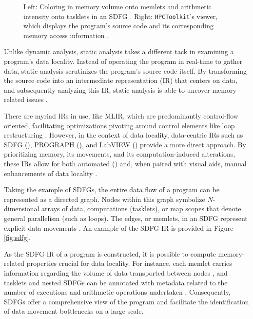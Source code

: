 \begin{figure}
\begin{subfigure}[c]{.68\textwidth}
	\end{subfigure}
	\caption{Left: Coloring in memory volume onto memlets and arithmetic intensity onto tasklets in an SDFG \cite{schaad2021boosting}. Right: \texttt{HPCToolkit}'s viewer, which displays the program's source code and its corresponding memory access information \cite{adhianto2010hpctoolkit}.}
	\label{fig:coarse}
\end{figure}

Unlike dynamic analysis, static analysis takes a different tack in examining a program's data locality. Instead of operating the program in real-time to gather data, static analysis scrutinizes the program's source code itself. By transforming the source code into an intermediate representation (IR) that centers on data, and subsequently analyzing this IR, static analysis is able to uncover memory-related issues \cite{schaad2022boosting,schaad2021boosting,calotoiu2022lifting,ben2023bridging}.

There are myriad IRs in use, like MLIR, which are predominantly control-flow oriented, facilitating optimizations pivoting around control elements like loop restructuring \cite{moses2021polygeist}. However, in the context of data locality, data-centric IRs such as SDFG (\cite{ben2019statefulSDFG}), PROGRAPH (\cite{matwin1985prograph}), and LabVIEW (\cite{kodosky2020labview}) provide a more direct approach. By prioritizing memory, its movements, and its computation-induced alterations, these IRs allow for both automated (\cite{ben2019statefulSDFG}) and, when paired with visual aids, manual enhancements of data locality \cite{ben2023bridging,ben2019statefulSDFG,schaad2021boosting}.

Taking the example of SDFGs, the entire data flow of a program can be represented as a directed graph. Nodes within this graph symbolize $N$-dimensional arrays of data, computations (tasklets), or map scopes that denote general parallelism (such as loops). The edges, or memlets, in an SDFG represent explicit data movements \cite{ben2019statefulSDFG}. An example of the SDFG IR is provided in Figure \ref{fig:sdfg}.

As the SDFG IR of a program is constructed, it is possible to compute memory-related properties crucial for data locality. For instance, each memlet carries information regarding the volume of data transported between nodes \cite{ben2019statefulSDFG}, and tasklets and nested SDFGs can be annotated with metadata related to the number of executions and arithmetic operations undertaken \cite{schaad2021boosting}. Consequently, SDFGs offer a comprehensive view of the program and facilitate the identification of data movement bottlenecks on a large scale.

